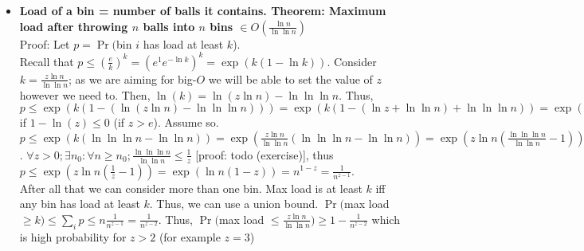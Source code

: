 \documentclass[20pt,a4paper,landscape]{extarticle}
\begin{document}
\begin{flushleft}
\begin{itemize}
$\sum_{S: |S| = k}$ Pr(every ball in $S$ goes into bin $i)$ [union bound] = $m\textrm{C}k\left(\frac{1}{n}\right)^k \leq \frac{m^k}{k!}\frac{1}{n^k} \leq \left(\frac{m}{n}\frac{e}{k}\right)^k$ $\left[\frac{1}{k!} \leq \left(\frac{e}{k}\right)^k \right.$ is an immediate corollary of Stirling's approximation: $\left.k! \geq \left(\frac{k}{e}\right)^k\right]$\\
$=\left(\frac{e}{k}\right)^k$ at $m=n$
\item \textbf{Load of a bin = number of balls it contains. Theorem: Maximum load after throwing $n$ balls into $n$ bins $\in O\left(\frac{\ln n}{\ln \ln n}\right)$}\\
Proof: Let $p = \Pr($bin $i$ has load at least $k$).\\
Recall that $p \leq \left(\frac{e}{k}\right)^k = \left(e^1e^{-\ln k}\right)^k = \exp\left(k\left(1 - \ln k\right)\right)$. Consider $k = \frac{z\ln n}{\ln \ln n}$; as we are aiming for big-$O$ we will be able to set the value of $z$ however we need to. Then, $\ln(k) = \ln(z \ln n) - \ln \ln \ln n$. Thus, $p \leq \exp\left(k\left(1 - \left(\ln(z \ln n) - \ln \ln \ln n\right)\right)\right) = \exp\left(k\left(1 - \left(\ln z + \ln \ln n\right) + \ln \ln \ln n\right)\right) = \exp\left(k\left(\ln \ln \ln n - \ln \ln n \right)\right)$ if $1-\ln(z) \leq 0$ (if $z > e$). Assume so. $p \leq \exp\left(k\left(\ln \ln \ln n - \ln \ln n \right)\right) = \exp\left(\frac{z\ln n}{\ln \ln n}\left(\ln \ln \ln n - \ln \ln n \right)\right) = \exp\left(z\ln n\left(\frac{\ln \ln \ln n}{\ln \ln n} - 1 \right)\right)$. $\forall z>0; \exists n_0: \forall n \geq n_0; \frac{\ln \ln \ln n}{\ln \ln n} \leq \frac{1}{z}$ [proof: todo (exercise)], thus $p \leq \exp\left(z\ln n\left(\frac{1}{z} - 1\right)\right) = \exp\left(\ln n\left(1 - z\right)\right) = n^{1-z} = \frac{1}{n^{z-1}}$.\\
After all that we can consider more than one bin. Max load is at least $k$ iff any bin has load at least $k$. Thus, we can use a union bound. $\Pr($max load $\geq k) \leq \sum_i p \leq n \frac{1}{n^{z-1}} = \frac{1}{n^{z-2}}$. Thus, $\Pr($max load $\leq \frac{z\ln n}{\ln \ln n}) \geq 1 - \frac{1}{n^{z-2}}$ which is high probability for $z > 2$ (for example $z=3$)
\end{itemize}
\item

\end{flushleft}
\end{document}
